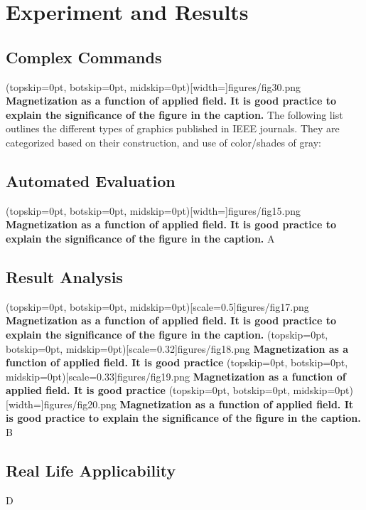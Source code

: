 \documentclass{ieeeaccess}
\begin{document}
\section{Experiment and Results}
\label{sec:guidelines}

\subsection{Complex Commands}
\Figure[t!](topskip=0pt, botskip=0pt, midskip=0pt)[width=\textwidth]{{figures/fig30.png}}
{ \textbf{Magnetization as a function of applied field.
It is good practice to explain the significance of the figure in the caption.}\label{fig6}}
The following list outlines the different types of graphics published in
IEEE journals. They are categorized based on their construction, and use of
color/shades of gray:



\subsection{Automated Evaluation}
\Figure[t!](topskip=0pt, botskip=0pt, midskip=0pt)[width=\textwidth]{{figures/fig15.png}}
{ \textbf{Magnetization as a function of applied field.
It is good practice to explain the significance of the figure in the caption.}\label{fig6}}
A
\subsection{Result Analysis}
\Figure[t!](topskip=0pt, botskip=0pt, midskip=0pt)[scale=0.5]{{figures/fig17.png}}
{ \textbf{Magnetization as a function of applied field.
It is good practice to explain the significance of the figure in the caption.}\label{fig8}}
\Figure[t!](topskip=0pt, botskip=0pt, midskip=0pt)[scale=0.32]{{figures/fig18.png}}
{ \textbf{Magnetization as a function of applied field.
It is good practice}\label{fig9}}
\Figure[t!](topskip=0pt, botskip=0pt, midskip=0pt)[scale=0.33]{{figures/fig19.png}}
{ \textbf{Magnetization as a function of applied field.
It is good practice}\label{fig10}}
\Figure[t!](topskip=0pt, botskip=0pt, midskip=0pt)[width=\textwidth]{{figures/fig20.png}}
{ \textbf{Magnetization as a function of applied field.
It is good practice to explain the significance of the figure in the caption.}\label{fig11}}
B

\subsection{Real Life Applicability}
D
\end{document}
